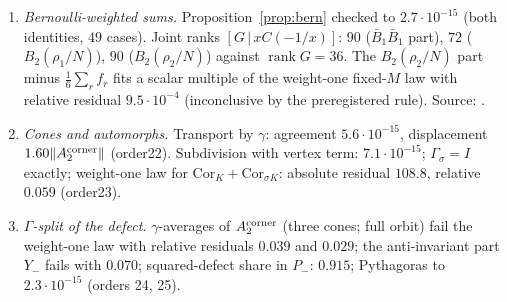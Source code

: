 \begin{enumerate}[label=D.\arabic*,leftmargin=3em]
and $7.8\cdot10^{-15}$ (order18). The affine law with $c=0$ fails on $x\in(0,3]$ with absolute residual $54.4$; the parts of $A_2^{\rm corner}$ fail every tested law, the
smallest relative residual being $3.1\cdot10^{-3}$ for the $B_2(\rho_2/N)$ part at $w=1$ (order19).
\item\label{catB:o20} \emph{Bernoulli-weighted sums.} Proposition~\ref{prop:bern} checked to $2.7\cdot10^{-15}$ (both identities, $49$ cases). Joint ranks
$[G\,|\,xC(-1/x)]$: $90$ ($\bar B_1\bar B_1$ part), $72$ ($B_2(\rho_1/N)$), $90$ ($B_2(\rho_2/N)$) against $\operatorname{rank}G=36$. The $B_2(\rho_2/N)$ part minus $\frac16\sum_rf_r$ fits a
scalar multiple of the weight-one fixed-$M$ law with relative residual $9.5\cdot10^{-4}$ (inconclusive by the preregistered rule). Source: .
\item\label{catB:o23} \emph{Cones and automorphs.} Transport by $\gamma$: agreement $5.6\cdot10^{-15}$, displacement $1.60\|A_2^{\rm corner}\|$ (order22). Subdivision with vertex term:
$7.1\cdot10^{-15}$; $\Gamma_\sigma=I$ exactly; weight-one law for $\mathrm{Cor}_K+\mathrm{Cor}_{\sigma K}$: absolute residual $108.8$, relative $0.059$ (order23).
\item\label{catB:o25} \emph{$\Gamma$-split of the defect.} $\gamma$-averages of $A_2^{\rm corner}$ (three cones; full orbit) fail the weight-one law with relative residuals $0.039$ and $0.029$; the
anti-invariant part $Y_-$ fails with $0.070$; squared-defect share in $P_-$: $0.915$; Pythagoras to $2.3\cdot10^{-15}$ (orders 24, 25).
\end{enumerate}
